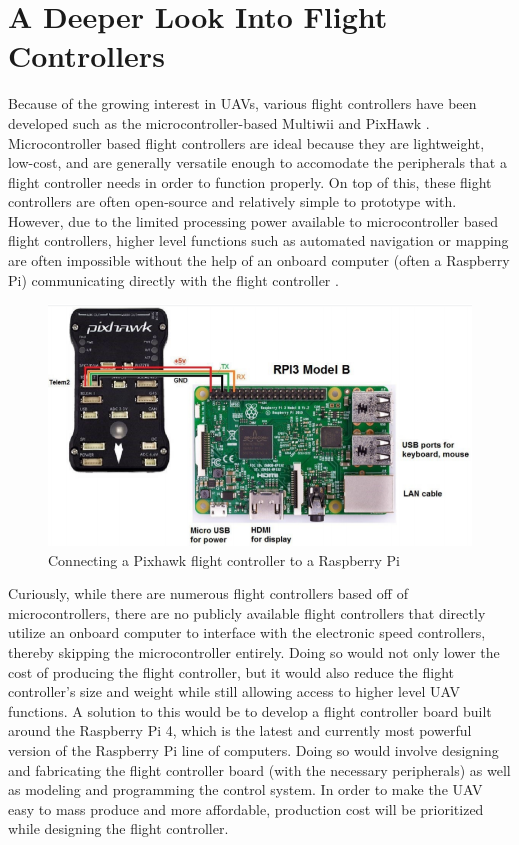 \documentclass[english]{upeeei}
\begin{document}
\section{A Deeper Look Into Flight Controllers}
Because of the growing interest in UAVs, various flight
controllers have been developed such as the microcontroller-based Multiwii \cite{MultiwiiFC} and PixHawk \cite{RPiMavlink2019}.
Microcontroller based flight controllers are ideal because they are lightweight, low-cost, and are generally versatile enough
to accomodate the peripherals that a flight controller needs in order to function properly. On top of this, these flight controllers
are often open-source and relatively simple to prototype with. However, due to the limited processing power available to 
microcontroller based flight controllers, higher level functions such as automated navigation or mapping are often impossible 
without the help of an onboard computer (often a Raspberry Pi) communicating directly with the flight controller 
\cite{RPiMavlink2019,Redtail2017,Dowling2018,Navio2,AirPy}.
\begin{figure}[h]
    \centering
    \includegraphics[scale=0.5]{images/phawkToPi.PNG}
    \caption{Connecting a Pixhawk flight controller to a Raspberry Pi \cite{RPiMavlink2019}}
    \label{fig:phawkToPi}
\end{figure}
Curiously, while there are numerous flight controllers based off of microcontrollers, there are no publicly available flight 
controllers that directly utilize an onboard computer to interface with the electronic speed controllers, thereby skipping
the microcontroller entirely. Doing so would not only lower the cost of producing the flight controller, but it would also
reduce the flight controller's size and weight while still allowing access to higher level UAV functions. A solution to this
would be to develop a flight controller board built around the Raspberry Pi 4, which is the latest and currently most powerful
version of the Raspberry Pi line of computers. Doing so would involve designing and fabricating the flight controller board (with
the necessary peripherals) as well as modeling and programming the control system. In order to make the UAV easy to mass produce 
and more affordable, production cost will be prioritized while designing the flight controller. 
\end{document}
